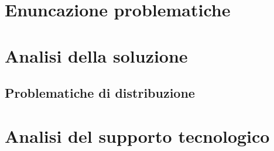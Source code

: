 \documentclass[a4paper]{article}
\begin{document}
\section{Enuncazione problematiche}

\section{Analisi della soluzione}

\subsection{Problematiche di distribuzione}


\section{Analisi del supporto tecnologico}

\appendix


\end{document}
